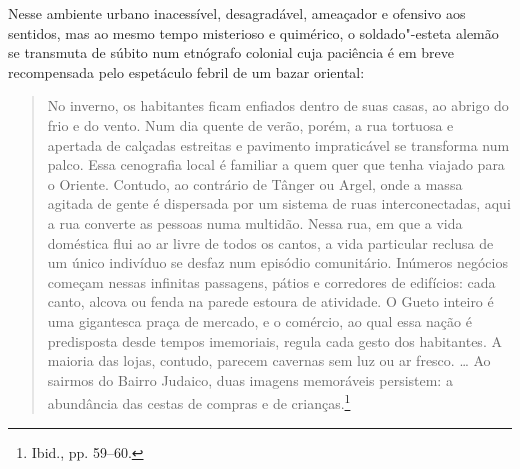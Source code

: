 Nesse ambiente urbano inacessível, desagradável, ameaçador e ofensivo
aos sentidos, mas ao mesmo tempo misterioso e quimérico, o
soldado"-esteta alemão se transmuta de súbito num etnógrafo colonial cuja
paciência é em breve recompensada pelo espetáculo febril de um bazar
oriental:

\begin{quote}
No inverno, os habitantes ficam enfiados dentro de suas casas, ao abrigo
do frio e do vento. Num dia quente de verão, porém, a rua tortuosa e
apertada de calçadas estreitas e pavimento impraticável se transforma
num palco. Essa cenografia local é familiar a quem quer que tenha
viajado para o Oriente. Contudo, ao contrário de Tânger ou Argel, onde a
massa agitada de gente é dispersada por um sistema de ruas
interconectadas, aqui a rua converte as pessoas numa multidão. Nessa
rua, em que a vida doméstica flui ao ar livre de todos os cantos, a vida
particular reclusa de um único indivíduo se desfaz num episódio
comunitário. Inúmeros negócios começam nessas infinitas passagens,
pátios e corredores de edifícios: cada canto, alcova ou fenda na parede
estoura de atividade. O Gueto inteiro é uma gigantesca praça de mercado,
e o comércio, ao qual essa nação é predisposta desde tempos imemoriais,
regula cada gesto dos habitantes. A maioria das lojas, contudo, parecem
cavernas sem luz ou ar fresco. \ldots{} Ao sairmos do Bairro Judaico,
duas imagens memoráveis persistem: a abundância das cestas de compras e
de crianças.\footnote{Ibid., pp. 59--60.}
\end{quote}

